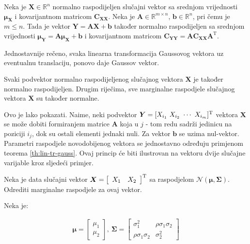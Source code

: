 \begin{theorem}
	\label{th:lin-tr-gauss}
	Neka je $\bm X \in \mathbb{R}^n$ normalno raspodijeljen slučajni vektor sa
	srednjom vrijednosti $\bm\mu_{\bm X}$ i kovarijantnom matricom $\bm C_{\bm
	X\bm X}$. Neka je $\bm A \in \mathbb{R}^{m\times n}$, $\bm b \in
	\mathbb{R}^n$, pri čemu je $m\le n$. Tada je vektor $\bm Y = \bm A \bm X + \bm
	b$ također normalno raspodijeljen sa srednjom vrijednosti $\bm\mu_{\bm Y} =
	\bm A\bm\mu_{\bm X} + \bm b$ i kovarijantnom matricom $\bm C_{\bm Y\bm Y} =
	\bm A \bm C_{\bm X\bm X} \bm A^\mathrm T$.

\end{theorem}

Jednostavnije rečeno, svaka linearna transformacija Gaussovog vektora uz
eventualnu translaciju, ponovo daje Gaussov vektor.

\begin{corollary}
	Svaki podvektor normalno raspodijeljenog slučajnog vektora $\bm X$ je također
	normalno raspodijeljen. Drugim riječima, sve marginalne raspodjele slučajnog
	vektora $\bm X$ su također normalne.
\end{corollary}

Ovo je lako pokazati. Naime, neki podvektor $\bm Y = [X_{i_1}\ X_{i_2}\ \cdots\
X_{i_m}]^\text T$ vektora $\bm X$ se može dobiti formiranjem matrice $\bm A$
koja u $j$ - tom redu sadrži jedinicu na poziciji $i_j$, dok su ostali elementi
jednaki nuli. Za vektor $\bm b$ se uzima nul-vektor.  Parametri raspodjele
novodobijenog vektora se jednostavno određuju primjenom teorema
\ref{th:lin-tr-gauss}. Ovaj princip će biti ilustrovan na vektoru dvije slučajne
varijable kroz sljedeći primjer.

\begin{exmp}
  Neka je data slučajni vektor $\bm X = \left[\begin{array}{cc}X_1&X_2\end{array}\right]^\mathrm T$ sa
  raspodjelom $\mathcal{N}(\bm\mu, \bm \Sigma)$. Odrediti marginalne raspodjele
  za ovaj vektor.
\end{exmp}

Neka je:

\begin{eqnarray} \label{eq:kovarijansa-2d}
	\bm\mu = \left[\begin{array}{c}
		\mu_1 \\ \mu_2
	\end{array}\right],\ 
	\bm\Sigma = \left[\begin{array}{cc}
	  \sigma_1^2 & \rho\sigma_1\sigma_2 \\  \rho\sigma_1\sigma_2 & \sigma_2^2
	\end{array}\right]
\end{eqnarray}


